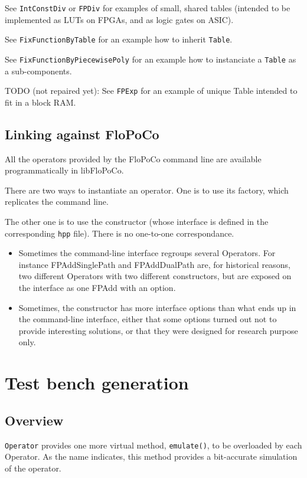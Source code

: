 \documentclass{article}
\begin{document}
See \texttt{IntConstDiv} or \texttt{FPDiv} for examples of small, shared tables (intended to be implemented as LUTs on FPGAs, and as logic gates on ASIC).

See \texttt{FixFunctionByTable} for an example how to inherit \texttt{Table}.

See \texttt{FixFunctionByPiecewisePoly} for an example how to instanciate a \texttt{Table} as a sub-components.

TODO (not repaired yet): See \texttt{FPExp} for an example of unique Table intended to fit in a block RAM.




\subsection{Linking against FloPoCo\label{sec:linking}}
All the operators provided by the FloPoCo command line are available programmatically in libFloPoCo.

There are two ways to instantiate an operator.
One is to use its factory, which replicates the command line.

The other one is to use the constructor (whose interface is defined in the corresponding \texttt{hpp} file).
There is no one-to-one correspondance.
\begin{itemize}
\item Sometimes the command-line interface regroups several Operators.
  For instance FPAddSinglePath and FPAddDualPath are, for historical reasons, two different Operators with two different constructors, but are exposed on the interface as one FPAdd with an option.
  
\item Sometimes, the constructor has more interface options than what ends up in the command-line interface, either that some options turned out not to provide interesting solutions, or that they were
  designed for research purpose only.
\end{itemize}

\section{Test bench generation}\label{sec:test-bench-gener}

\subsection{Overview}
\texttt{\small Operator} provides one more virtual method, \texttt{\small emulate()},
to be overloaded by each Operator. As the name indicates, this method
provides a bit-accurate simulation of the operator.
 
\end{document}
